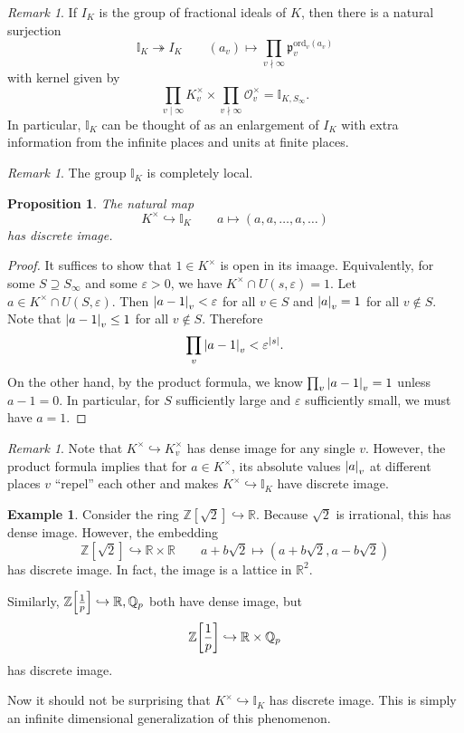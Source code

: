 \documentclass[leqno, openany]{memoir}
\newtheorem{prop}[thm]{Proposition}
\theoremstyle{definition}
\newtheorem{exm}[thm]{Example}
\theoremstyle{remark}
\newtheorem{rmk}[thm]{Remark}
\theoremstyle{plain}
\theoremstyle{definition}
\theoremstyle{remark}
\newcommand{\R}{\mathbb{R}}
\newcommand{\Z}{\mathbb{Z}}
\newcommand{\Q}{\mathbb{Q}}
\newcommand{\I}{\mathbb{I}}
\newcommand{\ep}{\varepsilon}
\newcommand{\mc}[1]{\mathcal{#1}}
\newcommand{\mf}[1]{\mathfrak{#1}}
\newcommand{\mr}[1]{\mathrm{#1}}
\begin{document}
\begin{rmk}
    If $I_K$ is the group of fractional ideals of $K$, then there is a natural surjection
    \[ \I_K \twoheadrightarrow I_K \qquad (a_v) \mapsto \prod_{v \nmid \infty} \mf{p}_v^{\mr{ord}_v(a_v)} \]
    with kernel given by 
    \[ \prod_{v \mid \infty} K_v^{\times} \times \prod_{v \nmid \infty} \mc{O}_v^{\times} = \I_{K, S_{\infty}}. \]
    In particular, $\I_K$ can be thought of as an enlargement of $I_K$ with extra information from the infinite places and units at finite places.
\end{rmk}

\begin{rmk}
    The group $\I_K$ is completely local. 
\end{rmk}

\begin{prop}
    The natural map 
    \[ K^{\times} \hookrightarrow \I_K \qquad a \mapsto (a, a, \ldots, a, \ldots) \]
    has discrete image.
\end{prop}

\begin{proof}
    It suffices to show that $1 \in K^{\times}$ is open in its imaage. Equivalently, for some $S \supseteq S_{\infty}$ and some $\ep > 0$, we have $K^{\times} \cap U(s, \ep) = \qty{1}$. Let $a \in K^{\times} \cap U(S, \ep)$. Then $\abs{a-1}_v < \ep$ for all $v \in S$ and $\abs{a}_v = 1$ for all $v \notin S$. Note that $\abs{a-1}_v \leq 1$ for all $v \notin S$. Therefore
    \[ \prod_v \abs{a-1}_v < \ep^{\abs{s}}. \]
    On the other hand, by the product formula, we know $\prod_v \abs{a-1}_v = 1$ unless $a-1 = 0$. In particular, for $S$ sufficiently large and $\ep$ sufficiently small, we must have $a = 1$.
\end{proof}

\begin{rmk}
    Note that $K^{\times} \hookrightarrow K_v^{\times}$ has dense image for any single $v$. However, the product formula implies that for $a \in K^{\times}$, its absolute values $\abs{a}_v$ at different places $v$ ``repel'' each other and makes $K^{\times} \hookrightarrow \I_K$ have discrete image.
\end{rmk}

\begin{exm}
    Consider the ring $\Z[\sqrt{2}] \hookrightarrow \R$. Because $\sqrt{2}$ is irrational, this has dense image. However, the embedding
    \[ \Z[\sqrt{2}] \hookrightarrow \R \times \R \qquad a+b\sqrt{2} \mapsto (a+b\sqrt{2}, a-b\sqrt{2}) \]
    has discrete image. In fact, the image is a lattice in $\R^2$.

    Similarly, $\Z\qty[\frac{1}{p}] \hookrightarrow \R, \Q_p$ both have dense image, but 
    \[ \Z\qty[\frac{1}{p}] \hookrightarrow \R \times \Q_p \]
    has discrete image.

    Now it should not be surprising that $K^{\times} \hookrightarrow \I_K$ has discrete image. This is simply an infinite dimensional generalization of this phenomenon.
\end{exm}
\end{document}
